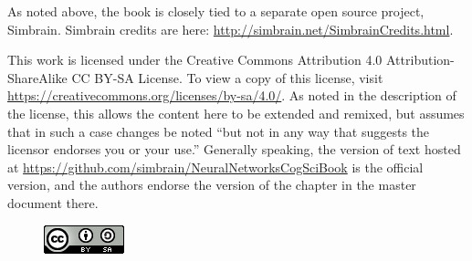 As noted above, the book is closely tied to a separate open source project, Simbrain. Simbrain credits are here: \url{http://simbrain.net/SimbrainCredits.html}. 

This work is licensed under the Creative Commons Attribution 4.0 Attribution-ShareAlike 
CC BY-SA  License. To view a copy of this license, visit \url{https://creativecommons.org/licenses/by-sa/4.0/}. As noted in the description of the license, this allows the content here to be extended and remixed, but assumes that in such a case changes be noted ``but not in any way that suggests the licensor endorses you or your use.''  Generally speaking, the version of text hosted at \url{https://github.com/simbrain/NeuralNetworksCogSciBook} is the official version, and the authors endorse the version of the chapter in the master document there.

\begin{figure}[h]
\includegraphics[scale=.7]{./images/CC_License.png}
\end{figure}

